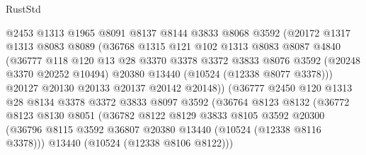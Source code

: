 \begin{lexlean}{RustStd}
\begin{coremodule}
                      @2453
                      @1313
                      @1965
                      @8091
                      @8137
                      @8144
                      @3833
                      @8068
                      @3592
                      (@20172
                        @1317
                        @1313
                        @8083
                        @8089
                        (@36768
                          @1315
                          @121
                          @102
                          @1313
                          @8083
                          @8087
                          @4840
                          (@36777
                            @118
                            @120
                            @13
                            @28
                            @3370
                            @3378
                            @3372
                            @3833
                            @8076
                            @3592
                            (@20248 @3370 @20252 @10494)
                            @20380
                            @13440
                            (@10524 (@12338 @8077 @3378)))
                          @20127
                          @20130
                          @20133
                          @20137
                          @20142
                          @20148))
                      (@36777
                        @2450
                        @120
                        @1313
                        @28
                        @8134
                        @3378
                        @3372
                        @3833
                        @8097
                        @3592
                        (@36764
                          @8123
                          @8132
                          (@36772
                            @8123
                            @8130
                            @8051
                            (@36782
                              @8122
                              @8129
                              @3833
                              @8105
                              @3592
                              @20300
                              (@36796
                                @8115
                                @3592
                                @36807
                                @20380
                                @13440
                                (@10524 (@12338 @8116 @3378)))
                              @13440
                              (@10524 (@12338 @8106 @8122)))

\end{coremodule}
\end{lexlean}
